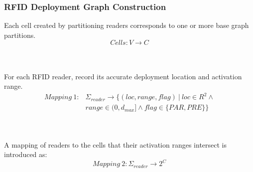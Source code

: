 \begin{frame}
\begin{columns}[c]
\end{columns}
\end{frame}


\begin{frame}
\frametitle{RFID Deployment Graph Construction}

  \small{Each cell created by partitioning readers corresponds to one or more base graph partitions.}
  \pause
  \begin{equation}
  Cells: V \rightarrow C
  \end{equation}
  \\~\\
  \pause

  \small{For each RFID reader, record its accurate deployment location and activation range.}
  \pause
  \begin{equation}
  \begin{split}
  Mapping~1: & \Sigma_{reader} \rightarrow \{ (loc, range, flag)~|~loc \in R^2 \wedge \\
    & range \in (0,d_{max}] \wedge flag \in \{ PAR, PRE \} \}
  \end{split}
  \end{equation}
  \\~\\
  \pause

  \small{A mapping of readers to the cells that their activation ranges intersect is introduced as:}
  \pause
  \begin{equation}
  Mapping~2: \Sigma_{reader} \rightarrow 2^C
  \end{equation}

\end{frame}


